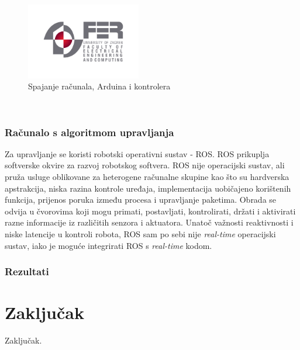 \documentclass[times, utf8, diplomski]{fer}
\begin{document}
\begin{figure}[htb]
\centering
\includegraphics[width=5cm]{img/fer_logo.jpg}
\caption{Spajanje računala, Arduina i kontrolera\protect\footnotemark}
\label{fig:cijeli sustav}
\end{figure}\\



\subsection{Računalo s algoritmom upravljanja}\label{sec:algoritam}
Za upravljanje se koristi robotski operativni sustav - ROS. ROS prikuplja softverske okvire za razvoj robotskog softvera. ROS nije operacijski sustav, ali pruža usluge oblikovane za heterogene računalne skupine kao što su hardverska apstrakcija, niska razina kontrole uređaja, implementacija uobičajeno korištenih funkcija, prijenos poruka između procesa i upravljanje paketima. Obrada se odvija u čvorovima  koji mogu primati, postavljati, kontrolirati,  držati i aktivirati razne informacije iz različitih senzora i aktuatora. Unatoč važnosti reaktivnosti i niske latencije u kontroli robota, ROS sam po sebi nije \emph{real-time} operacijski sustav, iako je moguće integrirati ROS s \emph{real-time} kodom. 

\subsection{Rezultati}
 


\chapter{Zaključak}
Zaključak.



\end{document}
